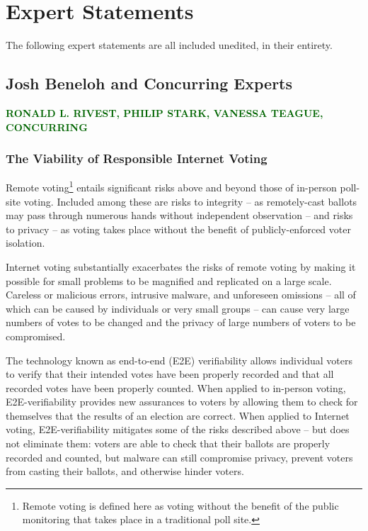\ifstatementsonly
\renewcommand{\thesection}{\arabic{section}}
\else
\chapter{Expert Statements}
\label{appendix:expert_statements}

The following expert statements are all included unedited, in their
entirety.
\fi

\section{Josh Beneloh and Concurring Experts}

{\Large\sffamily\bfseries\textcolor{DarkGreen}{\MakeUppercase{Ronald
      L. Rivest, Philip Stark, Vanessa Teague, Concurring}}}

\subsection*{The Viability of Responsible Internet Voting}

Remote voting\footnote{Remote voting is defined here as voting without
  the benefit of the public monitoring that takes place in a
  traditional poll site.}  entails significant risks above and beyond
those of in-person poll-site voting.  Included among these are risks
to integrity – as remotely-cast ballots may pass through numerous
hands without independent observation – and risks to privacy – as
voting takes place without the benefit of publicly-enforced voter
isolation.

Internet voting substantially exacerbates the risks of remote voting
by making it possible for small problems to be magnified and
replicated on a large scale.  Careless or malicious errors, intrusive
malware, and unforeseen omissions – all of which can be caused by
individuals or very small groups – can cause very large numbers of
votes to be changed and the privacy of large numbers of voters to be
compromised.

The technology known as end-to-end (E2E) verifiability allows
individual voters to verify that their intended votes have been
properly recorded and that all recorded votes have been properly
counted.  When applied to in-person voting, E2E-verifiability provides
new assurances to voters by allowing them to check for themselves that
the results of an election are correct.  When applied to Internet
voting, E2E-verifiability mitigates some of the risks described above
– but does not eliminate them:  voters are able to check that their
ballots are properly recorded and counted, but malware can still
compromise privacy, prevent voters from casting their ballots, and
otherwise hinder voters.

